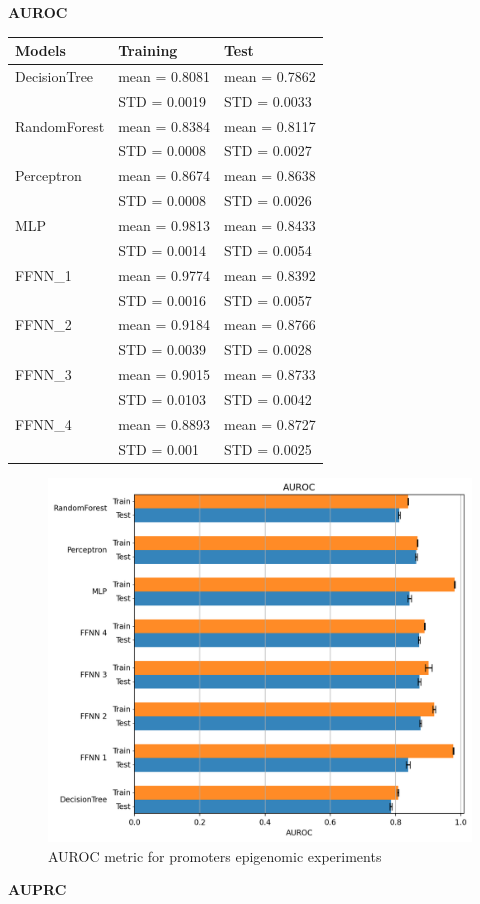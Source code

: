 \textbf{AUROC}

\begin{longtable}[]{@{}lll@{}}
\toprule
\textbf{Models} & \textbf{Training} & \textbf{Test}\tabularnewline
\midrule
\endhead
DecisionTree & mean = 0.8081 & mean = 0.7862\tabularnewline
& STD = 0.0019 & STD = 0.0033\tabularnewline
RandomForest & mean = 0.8384 & mean = 0.8117\tabularnewline
& STD = 0.0008 & STD = 0.0027\tabularnewline
Perceptron & mean = 0.8674 & mean = 0.8638\tabularnewline
& STD = 0.0008 & STD = 0.0026\tabularnewline
MLP & mean = 0.9813 & mean = 0.8433\tabularnewline
& STD = 0.0014 & STD = 0.0054\tabularnewline
FFNN\_1 & mean = 0.9774 & mean = 0.8392\tabularnewline
& STD = 0.0016 & STD = 0.0057\tabularnewline
FFNN\_2 & mean = 0.9184 & mean = 0.8766\tabularnewline
& STD = 0.0039 & STD = 0.0028\tabularnewline
FFNN\_3 & mean = 0.9015 & mean = 0.8733\tabularnewline
& STD = 0.0103 & STD = 0.0042\tabularnewline
FFNN\_4 & mean = 0.8893 & mean = 0.8727\tabularnewline
& STD = 0.001 & STD = 0.0025\tabularnewline
\bottomrule
\end{longtable}

\begin{figure}[h!]
\centering
\includegraphics[width=0.77\linewidth]{../images/epigemomic_results/promoters/auroc.png}
\caption{AUROC metric for promoters epigenomic experiments}
\end{figure}

\textbf{AUPRC}

